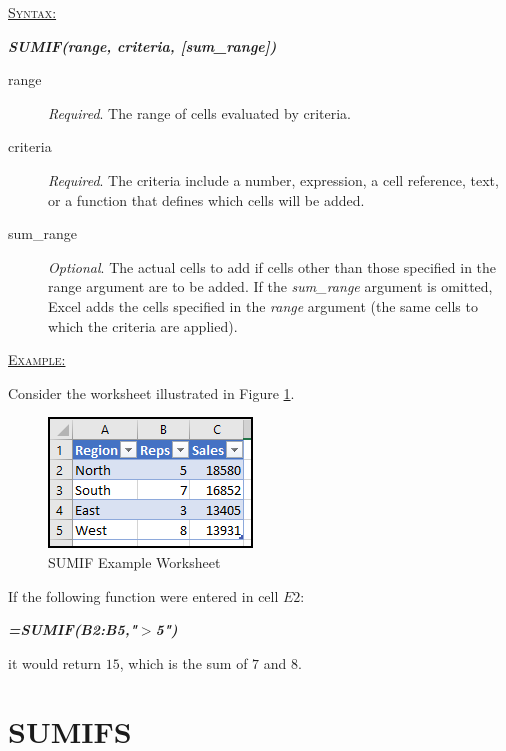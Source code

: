 \begin{addmargin}[1cm]{0cm}
	
	\medskip
	\underline{\textsc{Syntax:}}
	\medskip
	
	{\color{Syntax}
		\noindent\textbf{\textit{SUMIF(range, criteria, [sum\_range])}}
	}
	
	\begin{description}
		\item[range] \textit{Required}. The range of cells evaluated by criteria. 
		\item[criteria] \textit{Required}. The criteria include a number, expression, a cell reference, text, or a function that defines which cells will be added.
		\item[sum\_range] \textit{Optional}. The actual cells to add if cells other than those specified in the range argument are to be added. If the \textit{sum\_range} argument is omitted, Excel adds the cells specified in the \textit{range} argument (the same cells to which the criteria are applied).
	\end{description}

	\medskip
	\noindent\underline{\textsc{Example:}}
	\medskip
	
	\noindent Consider the worksheet illustrated in Figure \ref{apa:sif}.
	
	\begin{figure}[H]
		\centering
		\includegraphics[width=\maxwidth{.45\linewidth}]{gfx/apa_fig01}
		\caption{SUMIF Example Worksheet}
		\label{apa:sif}
	\end{figure}
	
	\noindent If the following function were entered in cell $ E2 $:
	
	{\color{Syntax}
		\textit{\textbf{=SUMIF(B2:B5,"$ > $5")}}
	}
	
	\noindent it would return $ 15 $, which is the sum of $ 7 $ and $ 8 $.

\end{addmargin}

\section{SUMIFS}

